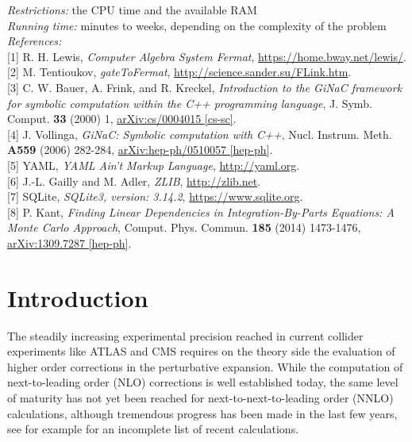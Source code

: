 \documentclass[a4paper,12pt]{scrartcl}
\begin{document}
\begin{small}
{\em Restrictions:} the CPU time and the available RAM\\
{\em Running time:} minutes to weeks, depending on the complexity of the problem\\
{\em References:} 
{\\} [1] R. H. Lewis, \textit{Computer Algebra System Fermat}, \url{https://home.bway.net/lewis/}.
{\\} [2] M. Tentioukov, \textit{gateToFermat}, \url{http://science.sander.su/FLink.htm}.
{\\} [3] C. W. Bauer, A. Frink, and R. Kreckel, \textit{Introduction to the GiNaC framework for symbolic computation within the C++ programming language}, J. Symb. Comput. \textbf{33} (2000) 1, \href{http://arxiv.org/abs/cs/0004015}{{\ttfamily arXiv:cs/0004015 [cs-sc]}}.
{\\} [4] J. Vollinga, \textit{GiNaC: Symbolic computation with C++}, Nucl. Instrum. Meth. \textbf{A559} (2006) 282-284, \href{http://arxiv.org/abs/hep-ph/0510057}{{\ttfamily arXiv:hep-ph/0510057 [hep-ph]}}.
{\\} [5] YAML, \textit{YAML Ain't Markup Language}, \url{http://yaml.org}.
{\\} [6] J.-L. Gailly and M. Adler, \textit{ZLIB}, \url{http://zlib.net}.
{\\} [7] SQLite, \textit{SQLite3, version: 3.14.2}, \url{https://www.sqlite.org}.
{\\} [8] P. Kant, \textit{Finding Linear Dependencies in Integration-By-Parts Equations: A Monte Carlo Approach}, Comput. Phys. Commun. \textbf{185} (2014) 1473-1476, \href{http://arxiv.org/abs/1309.7287}{{\ttfamily arXiv:1309.7287 [hep-ph]}}.
\end{small}



\newpage

\section{Introduction}

The steadily increasing experimental precision reached in current collider
experiments like ATLAS and CMS requires on the theory side the evaluation of
higher order corrections in the perturbative expansion. While the computation of
next-to-leading order (NLO) corrections is well established today, the same
level of maturity has not yet been reached for next-to-next-to-leading order
(NNLO) calculations, although tremendous progress has been made in the last few
years, see for example
\cite{Czakon:2013goa,Boughezal:2015dra,Chen:2014gva,Lindert:2017pky,%
Borowka:2016ehy,Ridder:2015dxa,Boughezal:2015ded,Boughezal:2015dva,%
Grazzini:2016swo,Grazzini:2015nwa,Gehrmann:2014fva,Caola:2015rqy,%
Caola:2015ila,Cascioli:2014yka,Caola:2015psa,Currie:2017tpe,Anastasiou:2016cez}
for an incomplete list of recent calculations.
\end{document}
